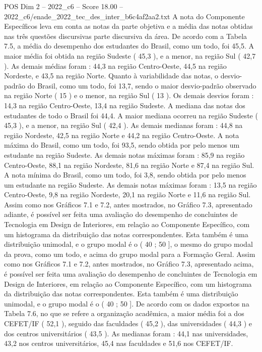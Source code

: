 \begin{textsample}{POS Dim 2 – 2022\_c6 – Score 18.00 – 2022\_c6/enade\_2022\_tec\_des\_inter\_b6c4af2aa2.txt}
A nota do Componente Específicos leva em conta as notas da parte objetiva e a média das notas obtidas nas três questões discursivas parte discursiva da área.
De acordo com a Tabela 7.5, a média do desempenho dos estudantes do Brasil, como um todo, foi 45,5.
A maior média foi obtida na região Sudeste ( 45,3 ), e a menor, na região Sul ( 42,7 ).
As demais médias foram : 44,3 na região Centro-Oeste, 44,5 na região Nordeste, e 43,5 na região Norte.
Quanto à variabilidade das notas, o desvio-padrão do Brasil, como um todo, foi 13,7, sendo o maior desvio-padrão observado na região Norte ( 15 ) e o menor, na região Sul ( 13 ).
Os demais desvios foram : 14,3 na região Centro-Oeste, 13,4 na região Sudeste.
A mediana das notas dos estudantes de todo o Brasil foi 44,4.
A maior mediana ocorreu na região Sudeste ( 45,3 ), e a menor, na região Sul ( 42,4 ).
As demais medianas foram : 44,8 na região Nordeste, 42,5 na região Norte e 44,2 na região Centro-Oeste.
A nota máxima do Brasil, como um todo, foi 93,5, sendo obtida por pelo menos um estudante na região Sudeste.
As demais notas máximas foram : 85,9 na região Centro-Oeste, 88,1 na região Nordeste, 81,6 na região Norte e 87,4 na região Sul.
A nota mínima do Brasil, como um todo, foi 3,8, sendo obtida por pelo menos um estudante na região Sudeste.
As demais notas máximas foram : 13,5 na região Centro-Oeste, 9,8 na região Nordeste, 20,1 na região Norte e 11,6 na região Sul.
Assim como nos Gráficos 7.1 e 7.2, antes mostrados, no Gráfico 7.3, apresentado adiante, é possível ser feita uma avaliação do desempenho de concluintes de Tecnologia em Design de Interiores, em relação ao Componente Específico, com um histograma da distribuição das notas correspondentes.
Esta também é uma distribuição unimodal, e o grupo modal é o ( 40 ; 50 ], o mesmo do grupo modal da prova, como um todo, e acima do grupo modal para a Formação Geral.
Assim como nos Gráficos 7.1 e 7.2, antes mostrados, no Gráfico 7.3, apresentado acima, é possível ser feita uma avaliação do desempenho de concluintes de Tecnologia em Design de Interiores, em relação ao Componente Específico, com um histograma da distribuição das notas correspondentes.
Esta também é uma distribuição unimodal, e o grupo modal é o ( 40 ; 50 ].
De acordo com os dados expostos na Tabela 7.6, no que se refere a organização acadêmica, a maior média foi a dos CEFET/IF ( 52,1 ), seguido das faculdades ( 45,2 ), das universidades ( 44,3 ) e dos centros universitários ( 43,5 ).
As medianas foram : 44,1 nas universidades, 43,2 nos centros universitários, 45,4 nas faculdades e 51,6 nos CEFET/IF.

\end{textsample}
